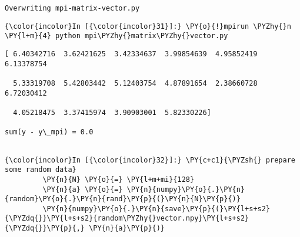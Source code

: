     \begin{Verbatim}[commandchars=\\\{\}]
Overwriting mpi-matrix-vector.py

    \end{Verbatim}

    \begin{Verbatim}[commandchars=\\\{\}]
{\color{incolor}In [{\color{incolor}31}]:} \PY{o}{!}mpirun \PYZhy{}n \PY{l+m}{4} python mpi\PYZhy{}matrix\PYZhy{}vector.py
\end{Verbatim}

    \begin{Verbatim}[commandchars=\\\{\}]
[ 6.40342716  3.62421625  3.42334637  3.99854639  4.95852419  6.13378754

  5.33319708  5.42803442  5.12403754  4.87891654  2.38660728  6.72030412

  4.05218475  3.37415974  3.90903001  5.82330226]

sum(y - y\_mpi) = 0.0


    \end{Verbatim}



    \begin{Verbatim}[commandchars=\\\{\}]
{\color{incolor}In [{\color{incolor}32}]:} \PY{c+c1}{\PYZsh{} prepare some random data}
         \PY{n}{N} \PY{o}{=} \PY{l+m+mi}{128}
         \PY{n}{a} \PY{o}{=} \PY{n}{numpy}\PY{o}{.}\PY{n}{random}\PY{o}{.}\PY{n}{rand}\PY{p}{(}\PY{n}{N}\PY{p}{)}
         \PY{n}{numpy}\PY{o}{.}\PY{n}{save}\PY{p}{(}\PY{l+s+s2}{\PYZdq{}}\PY{l+s+s2}{random\PYZhy{}vector.npy}\PY{l+s+s2}{\PYZdq{}}\PY{p}{,} \PY{n}{a}\PY{p}{)}
\end{Verbatim}

